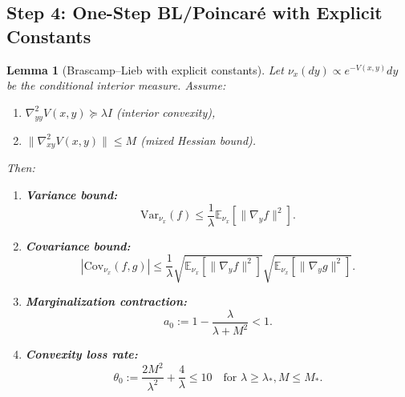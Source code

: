 \documentclass[11pt]{article}
\newtheorem{lemma}[theorem]{Lemma}
\theoremstyle{definition}
\newcommand{\1}{\mathbf{1}}
\begin{document}
\subsection{Step 4: One-Step BL/Poincaré with Explicit Constants}

\begin{lemma}[Brascamp--Lieb with explicit constants]\label{lem:step4-BL}
Let $\nu_x(dy) \propto e^{-V(x,y)} dy$ be the conditional interior measure. Assume:
\begin{enumerate}
\item[(i)] $\nabla^2_{yy} V(x,y) \succeq \lambda I$ (interior convexity),
\item[(ii)] $\|\nabla^2_{xy} V(x,y)\| \le M$ (mixed Hessian bound).
\end{enumerate}
Then:
\begin{enumerate}
\item \textbf{Variance bound:}
\begin{equation}\label{eq:step4-variance}
\mathrm{Var}_{\nu_x}(f) \le \frac{1}{\lambda} \mathbb{E}_{\nu_x}[\|\nabla_y f\|^2].
\end{equation}

\item \textbf{Covariance bound:}
\begin{equation}\label{eq:step4-covariance}
|\mathrm{Cov}_{\nu_x}(f, g)| \le \frac{1}{\lambda} \sqrt{\mathbb{E}_{\nu_x}[\|\nabla_y f\|^2]} 
\sqrt{\mathbb{E}_{\nu_x}[\|\nabla_y g\|^2]}.
\end{equation}

\item \textbf{Marginalization contraction:}
\begin{equation}\label{eq:step4-contraction}
a_0 := 1 - \frac{\lambda}{\lambda + M^2} < 1.
\end{equation}

\item \textbf{Convexity loss rate:}
\begin{equation}\label{eq:step4-theta}
\theta_0 := \frac{2M^2}{\lambda^2} + \frac{4}{\lambda} \le 10 \quad \text{for } \lambda \ge \lambda_*, M \le M_*.
\end{equation}
\end{enumerate}
\end{lemma}
\end{document}
